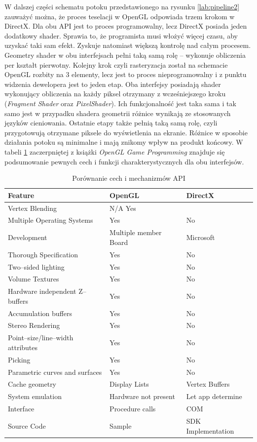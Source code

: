 \documentclass[archive]{mgr}
\begin{document}
W dalszej części schematu potoku przedstawionego na rysunku \ref{lab:pipeline2} zauważyć można, że proces teselacji w OpenGL odpowiada trzem krokom w DirectX. Dla obu API jest to proces programowalny, lecz DirectX posiada jeden dodatkowy shader. Sprawia to, że programista musi włożyć więcej czasu, aby uzyskać taki sam efekt. Zyskuje natomiast większą kontrolę nad całym procesem. Geometry shader w obu interfejsach pełni taką samą rolę – wykonuje obliczenia per kształt pierwotny. Kolejny krok czyli rasteryzacja został na schemacie OpenGL rozbity na 3 elementy, lecz jest to proces nieprogramowalny i z punktu widzenia dewelopera jest to jeden etap. Oba interfejsy posiadają shader wykonujący obliczenia na każdy piksel otrzymany z wcześniejszego kroku (\emph{Fragment Shader} oraz \emph{PixelShader}). Ich funkcjonalność jest taka sama i tak samo jest w przypadku shadera geometrii różnice wynikają ze stosowanych języków cieniowania. Ostatnie etapy także pełnią taką samą rolę, czyli przygotowują otrzymane piksele do wyświetlenia na ekranie. Różnice w sposobie działania potoku są minimalne i mają znikomy wpływ na produkt końcowy.  W tabeli \ref{lab1:comparetable123} zaczerpniętej z książki \emph{OpenGL Game Programming} \cite{book} znajduje się podsumowanie pewnych cech i funkcji charakterystycznych dla obu interfejsów.

\begin{table}[!h]

    \centering 
    \caption{Porównanie cech i mechanizmów API}
    		\label{lab1:comparetable123}
    \vspace{2mm} 
\begin{tabular}{|l|l|l|}
\hline

\textbf{Feature} &	\textbf{OpenGL}	&\textbf{DirectX}\\ \hline
Vertex Blending&	N/A	Yes&	\\ \hline
Multiple Operating Systems&	Yes&	No\\ \hline
Development&	Multiple member Board	&Microsoft\\ \hline
Thorough Specification&	Yes	&No\\ \hline
Two–sided lighting	&Yes&	No\\ \hline
Volume Textures&	Yes&	No\\ \hline
Hardware independent Z–buffers&	Yes	&No\\ \hline
Accumulation buffers&	Yes&	No\\ \hline
Stereo Rendering&	Yes&	No\\ \hline
Point–size/line–width attributes&	Yes	&No\\ \hline
Picking&	Yes&	No\\ \hline
Parametric curves and surfaces&	Yes&	No\\ \hline
Cache geometry&	Display Lists&	Vertex Buffers\\ \hline
System emulation&	Hardware not present&	Let app determine\\ \hline
Interface&	Procedure calls&	COM\\ \hline
Source Code&	Sample&	SDK Implementation\\ \hline

\end{tabular}
\end{table}
\end{document}

